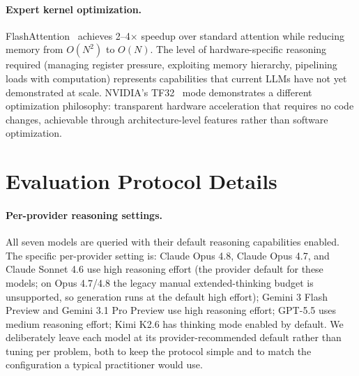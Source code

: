 \documentclass[11pt]{article}
\begin{document}
\paragraph{Expert kernel optimization.}
FlashAttention~\cite{flashattention} achieves 2--4$\times$ speedup over standard attention while reducing memory from $O(N^2)$ to $O(N)$.
The level of hardware-specific reasoning required (managing register pressure, exploiting memory hierarchy, pipelining loads with computation) represents capabilities that current LLMs have not yet demonstrated at scale.
NVIDIA's TF32~\cite{tf32nvidia} mode demonstrates a different optimization philosophy: transparent hardware acceleration that requires no code changes, achievable through architecture-level features rather than software optimization.

\section{Evaluation Protocol Details}
\label{app:eval_protocol}

\paragraph{Per-provider reasoning settings.} All seven models are queried with their default reasoning capabilities enabled. The specific per-provider setting is: Claude Opus 4.8, Claude Opus 4.7, and Claude Sonnet 4.6 use high reasoning effort (the provider default for these models; on Opus 4.7/4.8 the legacy manual extended-thinking budget is unsupported, so generation runs at the default high effort); Gemini 3 Flash Preview and Gemini 3.1 Pro Preview use high reasoning effort; GPT-5.5 uses medium reasoning effort; Kimi K2.6 has thinking mode enabled by default. We deliberately leave each model at its provider-recommended default rather than tuning per problem, both to keep the protocol simple and to match the configuration a typical practitioner would use.
\end{document}
